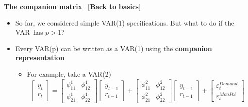 
\begin{frame}
{\color{note} \textbf{The companion matrix} \ {\footnotesize \textbf{[Back
to basics]}}}\vspace{-.1cm}

\begin{itemize}
\item So far, we considered simple VAR(1) specifications. But what to do if
the VAR\ has $p>1$?\bigskip

\item Every VAR(p) can be written as a VAR(1) using the \textbf{companion
representation}\bigskip

\begin{itemize}
\item For example, take a VAR(2)%
\begin{equation*}
\left[ 
\begin{array}{c}
y_{t} \\ 
r_{t}%
\end{array}%
\right] =%
\begin{bmatrix}
\phi _{11}^{1} & \phi _{12}^{1} \\ 
\phi _{21}^{1} & \phi _{22}^{1}%
\end{bmatrix}%
\left[ 
\begin{array}{c}
y_{t-1} \\ 
r_{t-1}%
\end{array}%
\right] +%
\begin{bmatrix}
\phi _{11}^{2} & \phi _{12}^{2} \\ 
\phi _{21}^{2} & \phi _{22}^{2}%
\end{bmatrix}%
\left[ 
\begin{array}{c}
y_{t-1} \\ 
r_{t-1}%
\end{array}%
\right] +%
\begin{bmatrix}
\varepsilon _{t}^{Demand} \\ 
\varepsilon _{t}^{MonPol}%
\end{bmatrix}%
\end{equation*}
\medskip


\end{itemize}
\end{itemize}
\end{frame}
